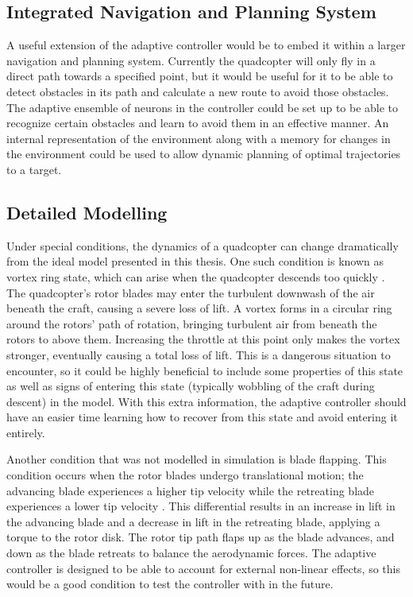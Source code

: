 \documentclass[letterpaper,12pt,titlepage,oneside,final]{book}
\begin{document}
\subsection{Integrated Navigation and Planning System}

A useful extension of the adaptive controller would be to embed it within a larger navigation and planning system.
Currently the quadcopter will only fly in a direct path towards a specified point, but it would be useful for it to be able to detect obstacles in its path and calculate a new route to avoid those obstacles.
The adaptive ensemble of neurons in the controller could be set up to be able to recognize certain obstacles and learn to avoid them in an effective manner.
An internal representation of the environment along with a memory for changes in the environment could be used to allow dynamic planning of optimal trajectories to a target.

\subsection{Detailed Modelling}

Under special conditions, the dynamics of a quadcopter can change dramatically from the ideal model presented in this thesis.
One such condition is known as vortex ring state, which can arise when the quadcopter descends too quickly \cite{vortexring}.
The quadcopter's rotor blades may enter the turbulent downwash of the air beneath the craft, causing a severe loss of lift.
A vortex forms in a circular ring around the rotors' path of rotation, bringing turbulent air from beneath the rotors to above them.
Increasing the throttle at this point only makes the vortex stronger, eventually causing a total loss of lift.
This is a dangerous situation to encounter, so it could be highly beneficial to include some properties of this state as well as signs of entering this state (typically wobbling of the craft during descent) in the model.
With this extra information, the adaptive controller should have an easier time learning how to recover from this state and avoid entering it entirely.

Another condition that was not modelled in simulation is blade flapping.
This condition occurs when the rotor blades undergo translational motion;
the advancing blade experiences a higher tip velocity while the retreating blade experiences a lower tip velocity \cite{bangura2012nonlinear}.
This differential results in an increase in lift in the advancing blade and a decrease in lift in the retreating blade, applying a torque to the rotor disk.
The rotor tip path flaps up as the blade advances, and down as the blade retreats to balance the aerodynamic forces.
The adaptive controller is designed to be able to account for external non-linear effects, so this would be a good condition to test the controller with in the future.
\end{document}
